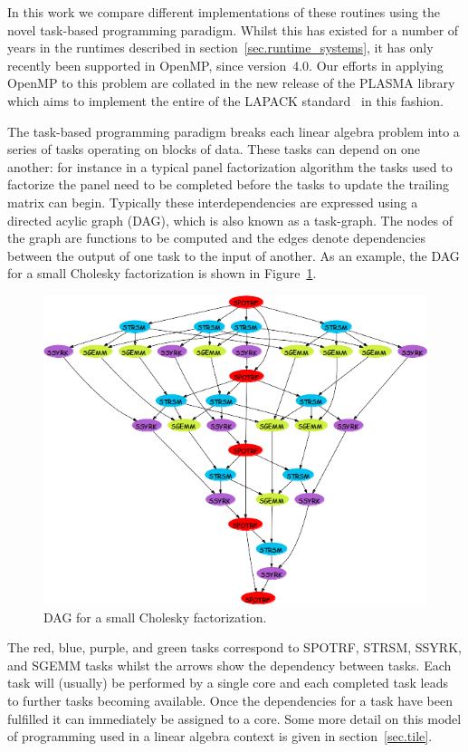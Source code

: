 \documentclass[a4paper,12pt]{article}
\begin{document}
In this work we compare different implementations of
these routines using the novel task-based programming paradigm.
Whilst this has existed for a number of years in the runtimes
described in section~\ref{sec.runtime_systems},
it has only recently been supported in OpenMP, since version~4.0.
Our efforts in applying OpenMP to this problem
are collated in the new release of the PLASMA library~\cite{addh09}
which aims to implement the entire of the LAPACK standard~\cite{lug99}
in this fashion.

The task-based programming paradigm breaks each linear algebra
problem into a series of tasks operating on blocks of data.
These tasks can depend on one another:
for instance in a typical panel factorization algorithm
the tasks used to factorize the panel need to be completed
before the tasks to update the trailing matrix can begin.
Typically these interdependencies are expressed using a
directed acylic graph (DAG),
which is also known as a task-graph.
The nodes of the graph are functions to be computed and
the edges denote dependencies between the output of one task
to the input of another.
As an example,
the DAG for a small Cholesky factorization is shown in
Figure~\ref{fig.chol_dag}.
\begin{figure}[th]
  \centering
  \includegraphics[scale=.55]{fig/spotrf_dag.png}
  \caption{DAG for a small Cholesky factorization.}
  \label{fig.chol_dag}
\end{figure}

The red, blue, purple, and green tasks correspond to
SPOTRF, STRSM, SSYRK, and SGEMM tasks
whilst the arrows show the dependency between tasks.
Each task will (usually) be performed by a single core
and each completed task leads to further tasks becoming available.
Once the dependencies for a task have been fulfilled it
can immediately be assigned to a core.
Some more detail on this model of programming
used in a linear algebra context is given in section~\ref{sec.tile}.
\end{document}
